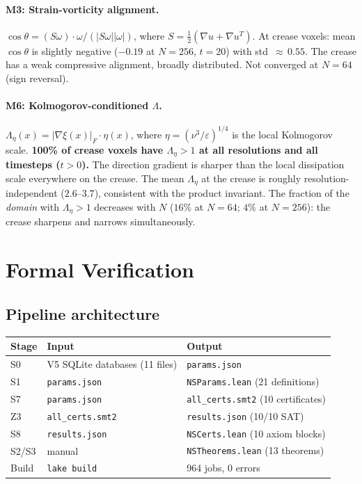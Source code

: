 \documentclass[11pt,a4paper]{article}
\theoremstyle{definition}
\newcommand{\grad}{\nabla}
\newcommand{\abs}[1]{\lvert #1 \rvert}
\newcommand{\strongclaim}[1]{\textbf{#1}}  %
\begin{document}
\paragraph{M3: Strain-vorticity alignment.}
$\cos\theta = (S\omega)\cdot\omega/(\abs{S\omega}\abs{\omega})$,
where $S=\tfrac{1}{2}(\grad u+\grad u^T)$.  At crease voxels:
mean $\cos\theta$ is slightly negative ($-0.19$ at $N{=}256$,
$t{=}20$) with std~${\approx}\,0.55$.  The crease has a weak
compressive alignment, broadly distributed.  Not converged at
$N{=}64$ (sign reversal).

\paragraph{M6: Kolmogorov-conditioned $\Lambda$.}
$\Lambda_\eta(x) = \abs{\grad\xi(x)}_F\cdot\eta(x)$, where
$\eta=(\nu^3/\varepsilon)^{1/4}$ is the local Kolmogorov scale.
\strongclaim{100\% of crease voxels have $\Lambda_\eta>1$ at all
resolutions and all timesteps ($t>0$).}  The direction gradient
is sharper than the local dissipation scale everywhere on the crease.
The mean $\Lambda_\eta$ at the crease is roughly
resolution-independent ($2.6$--$3.7$), consistent with the product
invariant.  The fraction of the \emph{domain} with $\Lambda_\eta>1$
decreases with $N$ ($16\%$ at $N{=}64$; $4\%$ at $N{=}256$): the
crease sharpens and narrows simultaneously.

\section{Formal Verification}\label{sec:formal}

\subsection{Pipeline architecture}

\begin{center}
\begin{tabular}{lll}
\toprule
Stage & Input & Output \\
\midrule
S0 & V5 SQLite databases (11 files) & \texttt{params.json} \\
S1 & \texttt{params.json} & \texttt{NSParams.lean} (21 definitions) \\
S7 & \texttt{params.json} & \texttt{all\_certs.smt2} (10 certificates) \\
Z3 & \texttt{all\_certs.smt2} & \texttt{results.json} (10/10 SAT) \\
S8 & \texttt{results.json} & \texttt{NSCerts.lean} (10 axiom blocks) \\
S2/S3 & manual & \texttt{NSTheorems.lean} (13 theorems) \\
Build & \texttt{lake build} & 964 jobs, 0 errors \\
\bottomrule
\end{tabular}
\end{center}
\end{document}
